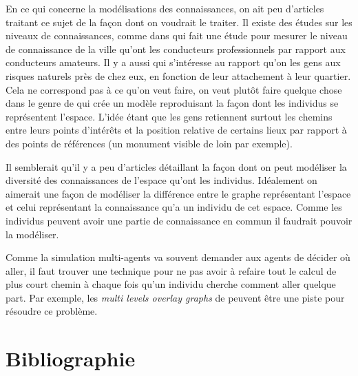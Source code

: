 \documentclass[a4paper]{article}
\begin{document}
En ce qui concerne la modélisations des connaissances, on ait peu d'articles
traitant ce sujet de la façon dont on voudrait le traiter. Il existe des études
sur les niveaux de connaissances, comme dans \cite{stern1988} qui fait une étude
pour mesurer le niveau de connaissance de la ville qu'ont les conducteurs
professionnels par rapport aux conducteurs amateurs. Il y a aussi
\cite{quinn2018} qui s'intéresse au rapport qu'on les gens aux risques naturels
près de chez eux, en fonction de leur attachement à leur quartier. Cela ne
correspond pas à ce qu'on veut faire, on veut plutôt faire quelque chose dans le
genre de \cite{kuipers1978} qui crée un modèle reproduisant la façon dont les
individus se représentent l'espace. L'idée étant que les gens retiennent surtout
les chemins entre leurs points d'intérêts et la position relative de certains
lieux par rapport à des points de références (un monument visible de loin par
exemple).

Il semblerait qu'il y a peu d'articles détaillant la façon dont on peut
modéliser la diversité des connaissances de l'espace qu'ont les individus.
Idéalement on aimerait une façon de modéliser la différence entre le graphe
représentant l'espace et celui représentant la connaissance qu'a un individu de
cet espace. Comme les individus peuvent avoir une partie de connaissance en
commun il faudrait pouvoir la modéliser.

Comme la simulation multi-agents va souvent demander aux agents de décider où
aller, il faut trouver une technique pour ne pas avoir à refaire tout le calcul
de plus court chemin à chaque fois qu'un individu cherche comment aller quelque
part. Par exemple, les \emph{multi levels overlay graphs} de \cite{holzer2009}
peuvent être une piste pour résoudre ce problème.

\section{Bibliographie}

 
\end{document}
